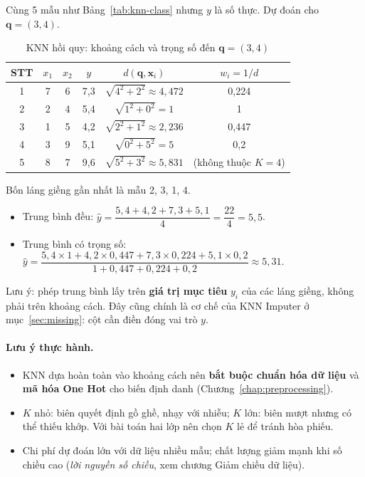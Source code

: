 \begin{example}[Tính tay KNN hồi quy với $K = 4$]
Cùng 5 mẫu như Bảng~\ref{tab:knn-class} nhưng $y$ là số thực. Dự đoán cho $\mathbf{q} = (3, 4)$.
\end{example}

\begin{table}[H]
\centering
\begin{tabular}{|c|c|c|c|c|c|}
\hline
\textbf{STT} & $x_1$ & $x_2$ & $y$ & $d(\mathbf{q}, \mathbf{x}_i)$ & $w_i = 1/d$ \\
\hline
1 & 7 & 6 & 7,3 & $\sqrt{4^2 + 2^2} \approx 4{,}472$ & 0,224 \\ \hline
2 & 2 & 4 & 5,4 & $\sqrt{1^2 + 0^2} = 1$ & 1 \\ \hline
3 & 1 & 5 & 4,2 & $\sqrt{2^2 + 1^2} \approx 2{,}236$ & 0,447 \\ \hline
4 & 3 & 9 & 5,1 & $\sqrt{0^2 + 5^2} = 5$ & 0,2 \\ \hline
5 & 8 & 7 & 9,6 & $\sqrt{5^2 + 3^2} \approx 5{,}831$ & (không thuộc $K = 4$) \\ \hline
\end{tabular}
\caption{KNN hồi quy: khoảng cách và trọng số đến $\mathbf{q} = (3, 4)$}
\label{tab:knn-reg}
\end{table}

Bốn láng giềng gần nhất là mẫu 2, 3, 1, 4.
\begin{itemize}
    \item Trung bình đều: $\hat{y} = \dfrac{5{,}4 + 4{,}2 + 7{,}3 + 5{,}1}{4} = \dfrac{22}{4} = 5{,}5$.
    \item Trung bình có trọng số: $\hat{y} = \dfrac{5{,}4 \times 1 + 4{,}2 \times 0{,}447 + 7{,}3 \times 0{,}224 + 5{,}1 \times 0{,}2}{1 + 0{,}447 + 0{,}224 + 0{,}2} \approx 5{,}31$.
\end{itemize}
Lưu ý: phép trung bình lấy trên \textbf{giá trị mục tiêu} $y_i$ của các láng giềng, không phải trên khoảng cách. Đây cũng chính là cơ chế của KNN Imputer ở mục~\ref{sec:missing}: cột cần điền đóng vai trò $y$.

\paragraph{Lưu ý thực hành.}
\begin{itemize}
    \item KNN dựa hoàn toàn vào khoảng cách nên \textbf{bắt buộc chuẩn hóa dữ liệu} và \textbf{mã hóa One Hot} cho biến định danh (Chương~\ref{chap:preprocessing}).
    \item $K$ nhỏ: biên quyết định gồ ghề, nhạy với nhiễu; $K$ lớn: biên mượt nhưng có thể thiếu khớp. Với bài toán hai lớp nên chọn $K$ lẻ để tránh hòa phiếu.
    \item Chi phí dự đoán lớn với dữ liệu nhiều mẫu; chất lượng giảm mạnh khi số chiều cao (\textit{lời nguyền số chiều}, xem chương Giảm chiều dữ liệu).
\end{itemize}

